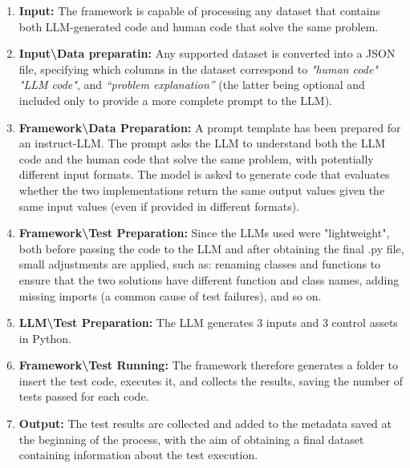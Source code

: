 \begin{enumerate}
\item \textbf{Input:} The framework is capable of processing any dataset 
that contains both LLM-generated code and human code that solve the same problem.

\item \textbf{Input\textbackslash Data preparatin:} Any supported dataset is converted into a JSON file, 
specifying which columns in the dataset correspond to \textit{"human code"} \textit{"LLM code"}, and 
\textit{“problem explanation”} (the latter being optional and included only to 
provide a more complete prompt to the LLM).

\item \textbf{Framework\textbackslash Data Preparation:} A prompt template has 
been prepared for an instruct-LLM. The prompt asks the LLM to understand both the LLM code and 
the human code that solve the same problem, with potentially different input formats. 
The model is asked to generate code that evaluates whether the two implementations return 
the same output values given the same input values (even if provided in different formats).



\item \textbf{Framework\textbackslash Test Preparation:} Since the LLMs used were "lightweight", 
both before passing the code to the LLM and after obtaining the final .py file, small 
adjustments are applied, such as: renaming classes and functions to ensure that the two 
solutions have different function and class names, adding missing imports 
(a common cause of test failures), and so on.

\item \textbf{LLM\textbackslash Test Preparation:} The LLM generates 3 inputs and 3 control assets in Python.

\item \textbf{Framework\textbackslash Test Running:} The framework therefore generates a folder 
to insert the test code, executes it, and collects the results, saving the number of tests 
passed for each code.

\item \textbf{Output:} The test results are collected and added to the 
metadata saved at the beginning of the process, with the aim of obtaining a 
final dataset containing information about the test execution.



\end{enumerate}




